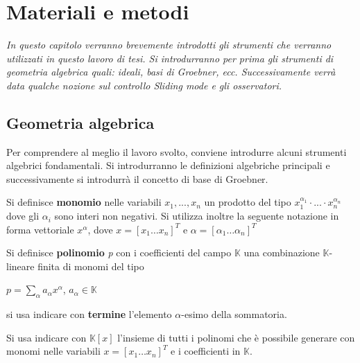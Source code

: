 \chapter{Materiali e metodi}
\label{chap:MatAndMethod}

\begin{minipage}{12cm}\textit{In questo capitolo verranno brevemente introdotti gli strumenti che verranno utilizzati in questo lavoro di tesi. Si introdurranno per prima gli strumenti di geometria algebrica quali: ideali, basi di Groebner, ecc. Successivamente verrà data qualche nozione sul controllo Sliding mode e gli osservatori.}
\end{minipage}

\vspace*{1cm}

\section{Geometria algebrica}
\label{sec:Geom}

Per comprendere al meglio il lavoro svolto, conviene introdurre alcuni strumenti algebrici fondamentali. Si introdurranno le definizioni algebriche principali e successivamente si introdurrà il concetto di base di Groebner. 

\begin{defn}Si definisce \textbf{monomio} nelle variabili \textit{$x_1, ..., x_n$} un prodotto del tipo $x_1^{\alpha_1} \cdot ... \cdot x_n^{\alpha_n}$ dove gli $\alpha_i$ sono interi non negativi. Si utilizza inoltre la seguente notazione in forma vettoriale \textbf{$x^\alpha$}, dove $x = [x_1 \dots x_n]^T$ e $\alpha = [\alpha_1 \dots \alpha_n]^T$ 	
\end{defn}

\begin{defn}Si definisce \textbf{polinomio} \textit{p} con i coefficienti del campo $\mathbb{K}$ una combinazione $\mathbb{K}$-lineare finita di monomi del tipo
	\begin{center}
		$p = \sum_{\alpha}^{} a_\alpha x^{\alpha}$, $a_\alpha \in \mathbb{K}$
	\end{center}
	si usa indicare con \textbf{termine} l'elemento $\alpha$-esimo della sommatoria.	
\end{defn}

\begin{defn}
	Si usa indicare con $\mathbb{K}[x]$ l'insieme di tutti i polinomi che è possibile generare con monomi nelle variabili $x = [x_1 \dots x_n]^T$ e i coefficienti in $\mathbb{K}$.
\end{defn}

